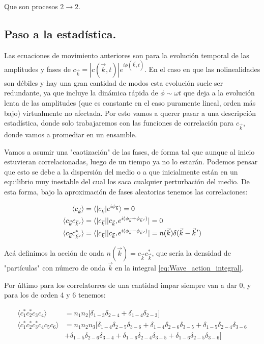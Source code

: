 Que son procesos $2\rightarrow2$.

\subsection*{Paso a la estadística.}
Las ecuaciones de movimiento anteriores son para la evolución temporal de las amplitudes y fases de $c_{\vec k} = |c(\vec k, t)|e^{i\phi(\vec k, t)}$. En el caso en que las nolinealidades son débiles y hay una gran cantidad de modos esta evolución suele ser redundante, ya que incluye la dinámica rápida de $\phi\sim\omega t$ que deja a la evolución lenta de las amplitudes (que es constante en el caso puramente lineal, orden más bajo) virtualmente no afectada. Por esto vamos a querer pasar a una descripción estadística, donde solo trabajaremos con las funciones de correlación para $c_{\vec k}$, donde vamos a promediar en un ensamble.

Vamos a asumir una "caotización" de las fases, de forma tal que aunque al inicio estuvieran correlacionadas, luego de un tiempo ya no lo estarán. Podemos pensar que esto se debe a la dispersión del medio o a que inicialmente están en un equilibrio muy inestable del cual los saca cualquier perturbación del medio. De esta forma, bajo la aproximación de fases aleatorias tenemos las correlaciones:

\begin{align}
	\langle c_{\vec k}\rangle &= \langle |c_{\vec k}|e^{i\phi_{\vec k}}	 \rangle = 0 \\
	\langle c_{\vec k} c_{\pvec k'} \rangle &= \langle |c_{\vec k}||c_{\pvec k'} e^{i(\phi_{\vec k}+\phi_{\pvec k'})}| = 0 \\
	\langle c_{\vec k} c^*_{\pvec k'} \rangle  &= \langle |c_{\vec k}||c_{\pvec k'} e^{i(\phi_{\vec k}-\phi_{\pvec k'})}| = n(\vec k) \delta(\vec k - \pvec k')
\end{align} 

Acá definimos la acción de onda $n(\vec k) = c_{\vec k}c^*_{\vec k}$, que sería la densidad de "partículas" con número de onda $\vec k$ en la integral \eqref{eq:Wave_action_integral}.  

Por último para los correlatorres de una cantidad impar siempre van a dar 0, y para los de orden 4 y 6 tenemos:

\begin{align}
	\langle	c_1^*c_2^*c_3c_4 \rangle & = n_1 n_2 \big[\delta_{1-3}\delta_{2-4} + \delta_{1-4}\delta_{2-3}\big] \\ 
	\langle c_1^*c_2^*c_3^*c_4c_5c_6 \rangle &= n_1n_2n_3\big[  \delta_{1-4}\delta_{2-5}\delta_{3-6} + \delta_{1-4}\delta_{2-6}\delta_{3-5} + \delta_{1-5}\delta_{2-4}\delta_{3-6} \\ 
	& +\delta_{1-5}\delta_{2-6}\delta_{3-4} + \delta_{1-6}\delta_{2-4}\delta_{3-5} + \delta_{1-6}\delta_{2-5}\delta_{3-6} \big] 
\end{align}

